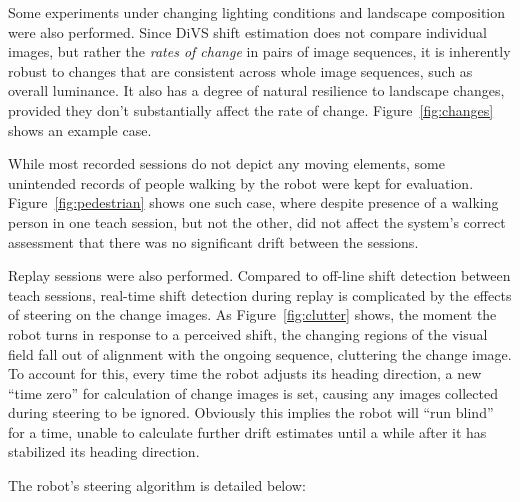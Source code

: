 \documentclass[twocolumn, 9pt,fleqn]{jsproceedings}
\begin{document}
Some experiments under changing lighting conditions and landscape composition were also performed. Since DiVS shift estimation does not compare individual images, but rather the {\it rates of change} in pairs of image sequences, it is inherently robust to changes that are consistent across whole image sequences, such as overall luminance. It also has a degree of natural resilience to landscape changes, provided they don't substantially affect the rate of change. Figure~\ref{fig:changes} shows an example case.

While most recorded sessions do not depict any moving elements, some unintended records of people walking by the robot were kept for evaluation. Figure~\ref{fig:pedestrian} shows one such case, where despite presence of a walking person in one teach session, but not the other, did not affect the system's correct assessment that there was no significant drift between the sessions.

Replay sessions were also performed. Compared to off-line shift detection between teach sessions, real-time shift detection during replay is complicated by the effects of steering on the change images. As Figure~\ref{fig:clutter} shows, the moment the robot turns in response to a perceived shift, the changing regions of the visual field fall out of alignment with the ongoing sequence, cluttering the change image. To account for this, every time the robot adjusts its heading direction, a new ``time zero'' for calculation of change images is set, causing any images collected during steering to be ignored. Obviously this implies the robot will ``run blind'' for a time, unable to calculate further drift estimates until a while after it has stabilized its heading direction.

The robot's steering algorithm is detailed below:
\end{document}
